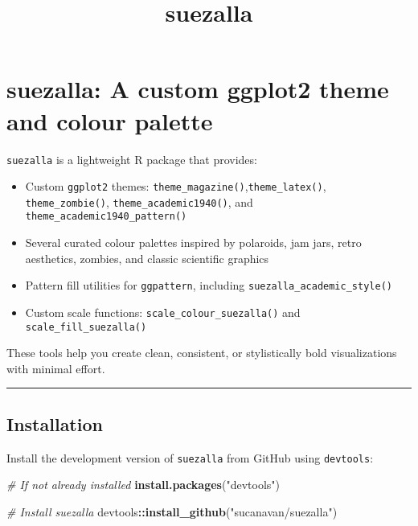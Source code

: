 \documentclass[
]{article}
\title{suezalla}
\author{}
\date{\vspace{-2.5em}}
\newenvironment{Shaded}{\begin{snugshade}}{\end{snugshade}}
\newcommand{\CommentTok}[1]{\textcolor[rgb]{0.56,0.35,0.01}{\textit{#1}}}
\newcommand{\FunctionTok}[1]{\textcolor[rgb]{0.13,0.29,0.53}{\textbf{#1}}}
\newcommand{\NormalTok}[1]{#1}
\newcommand{\SpecialCharTok}[1]{\textcolor[rgb]{0.81,0.36,0.00}{\textbf{#1}}}
\newcommand{\StringTok}[1]{\textcolor[rgb]{0.31,0.60,0.02}{#1}}
\providecommand{\tightlist}{%
  \setlength{\itemsep}{0pt}\setlength{\parskip}{0pt}}
\begin{document}
\maketitle

{
\setcounter{tocdepth}{2}
\tableofcontents
}
\section{suezalla: A custom ggplot2 theme and colour
palette}\label{suezalla-a-custom-ggplot2-theme-and-colour-palette}

\texttt{suezalla} is a lightweight R package that provides:

\begin{itemize}
\tightlist
\item
  Custom \texttt{ggplot2} themes:
  \texttt{theme\_magazine()},\texttt{theme\_latex()},
  \texttt{theme\_zombie()}, \texttt{theme\_academic1940()}, and
  \texttt{theme\_academic1940\_pattern()}
\item
  Several curated colour palettes inspired by polaroids, jam jars, retro
  aesthetics, zombies, and classic scientific graphics
\item
  Pattern fill utilities for \texttt{ggpattern}, including
  \texttt{suezalla\_academic\_style()}
\item
  Custom scale functions: \texttt{scale\_colour\_suezalla()} and
  \texttt{scale\_fill\_suezalla()}
\end{itemize}

These tools help you create clean, consistent, or stylistically bold
visualizations with minimal effort.

\begin{center}\rule{0.5\linewidth}{0.5pt}\end{center}

\subsection{Installation}\label{installation}

Install the development version of \texttt{suezalla} from GitHub using
\texttt{devtools}:

\begin{Shaded}
\begin{Highlighting}[]
\CommentTok{\# If not already installed}
\FunctionTok{install.packages}\NormalTok{(}\StringTok{"devtools"}\NormalTok{)}

\CommentTok{\# Install suezalla}
\NormalTok{devtools}\SpecialCharTok{::}\FunctionTok{install\_github}\NormalTok{(}\StringTok{"sucanavan/suezalla"}\NormalTok{)}
\end{Highlighting}
\end{Shaded}
\end{document}
